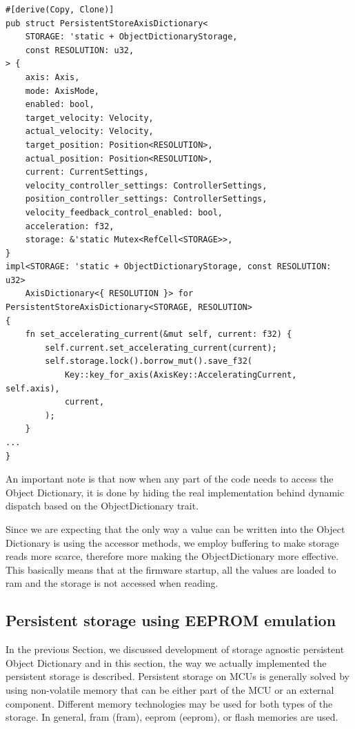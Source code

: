 \begin{lstlisting}[caption={Object Dictionary for persistently storing axis data.},label=lst:persistent_store_dict]
#[derive(Copy, Clone)]
pub struct PersistentStoreAxisDictionary<
    STORAGE: 'static + ObjectDictionaryStorage,
    const RESOLUTION: u32,
> {
    axis: Axis,
    mode: AxisMode,
    enabled: bool,
    target_velocity: Velocity,
    actual_velocity: Velocity,
    target_position: Position<RESOLUTION>,
    actual_position: Position<RESOLUTION>,
    current: CurrentSettings,
    velocity_controller_settings: ControllerSettings,
    position_controller_settings: ControllerSettings,
    velocity_feedback_control_enabled: bool,
    acceleration: f32,
    storage: &'static Mutex<RefCell<STORAGE>>,
}
impl<STORAGE: 'static + ObjectDictionaryStorage, const RESOLUTION: u32>
    AxisDictionary<{ RESOLUTION }> for PersistentStoreAxisDictionary<STORAGE, RESOLUTION>
{
    fn set_accelerating_current(&mut self, current: f32) {
        self.current.set_accelerating_current(current);
        self.storage.lock().borrow_mut().save_f32(
            Key::key_for_axis(AxisKey::AcceleratingCurrent, self.axis),
            current,
        );
    }
...
}
\end{lstlisting}

An important note is that now when any part of the code needs to access the Object Dictionary, it is done by hiding the real implementation behind dynamic dispatch based on the ObjectDictionary trait.

Since we are expecting that the only way a value can be written into the Object Dictionary is using the accessor methods, we employ buffering to make storage reads more scarce, therefore more making the ObjectDictionary more effective.
This basically means that at the firmware startup, all the values are loaded to \acs{ram} and the storage is not accessed when reading.

\subsection{Persistent storage using EEPROM emulation}
\label{subsec:eeprom}
In the previous Section, we discussed development of storage agnostic persistent Object Dictionary and in this section, the way we actually implemented the persistent storage is described.
Persistent storage on MCUs is generally solved by using non-volatile memory that can be either part of the MCU or an external component.
Different memory technologies may be used for both types of the storage.
In general, \acs{fram} (\acl{fram}), \acs{eeprom} (\acl{eeprom}), or flash memories are used.

